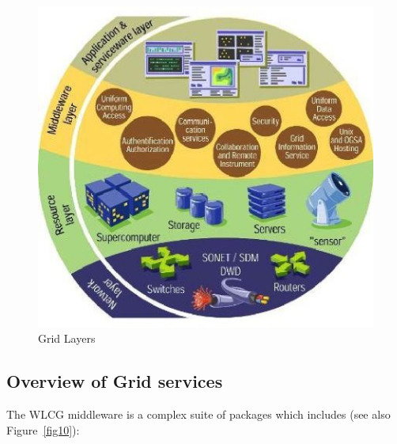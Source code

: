 \documentclass{intech}
\begin{document}
\begin{figure}[htb] %
\centering
\includegraphics[width=13cm]{fig09.eps} %
\caption{Grid Layers}\label{fig09}
\end{figure}



\subsection{Overview of Grid services}
%
The WLCG middleware is a complex suite of packages which includes
(see also Figure~\ref{fig10}):
\end{document}
